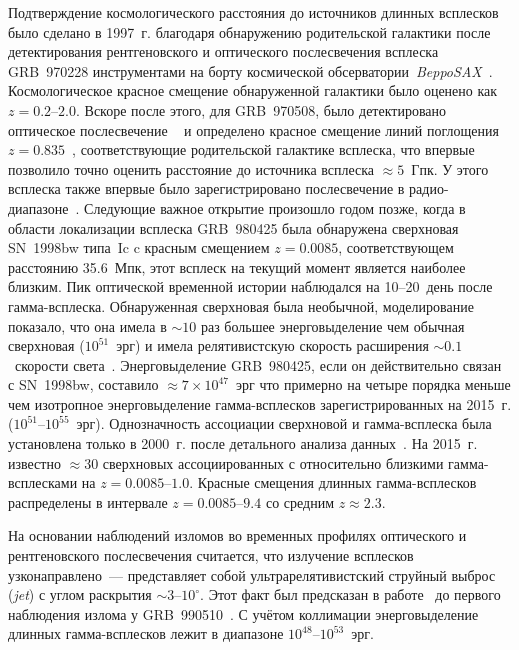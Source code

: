 Подтверждение космологического расстояния до источников длинных всплесков 
было сделано в 1997~г. благодаря обнаружению родительской галактики после детектирования 
рентгеновского и оптического послесвечения всплеска GRB~970228 инструментами на 
борту космической обсерватории~\textit{BeppoSAX}~\citep{Costa1997Natur, van_Paradijs_1997Natur}.
Космологическое красное смещение обнаруженной галактики было оценено как $z=0.2\mbox{--}2.0$.
Вскоре после этого, для GRB~970508, было детектировано оптическое послесвечение 
~\citep{Djorgovski_1997Natur} и определено красное смещение линий 
поглощения $z=0.835$~\citep{Metzger_1997Natur, Reichart_1998ApJ}, соответствующие родительской галактике 
всплеска, что впервые позволило точно оценить расстояние до источника всплеска $\approx 5$~Гпк. 
У этого всплеска также впервые было зарегистрировано послесвечение в радио-диапазоне~\citep{Frail_1997Natur}.
Следующие важное открытие произошло годом позже, когда в области локализации 
всплеска GRB~980425 была обнаружена сверхновая SN~1998bw типа~Ic c красным смещением $z=0.0085$,
соответствующем расстоянию 35.6~Мпк, этот всплеск на текущий момент является наиболее близким.
Пик оптической временной истории наблюдался на 10--20~день после гамма-всплеска.
Обнаруженная сверхновая была необычной, моделирование показало, что она 
имела в $\sim 10$ раз большее энерговыделение чем обычная 
сверхновая ($10^{51}$~эрг) и имела релятивистскую скорость расширения 
$\sim 0.1$~скорости света~\citep{Hjorth_and_Bloom_2012in_book}. 
Энерговыделение GRB~980425, если он действительно связан с SN~1998bw, составило 
$\approx 7\times 10^{47}$~эрг что примерно на четыре порядка меньше чем изотропное энерговыделение 
гамма-всплесков зарегистрированных на 2015~г. ($10^{51}$--$10^{55}$~эрг).
Однозначность ассоциации сверхновой и гамма-всплеска была установлена только в 2000~г.
после детального анализа данных~\citep{Pian_2000ApJ}. На 2015~г. известно $\approx 30$
сверхновых ассоциированных с относительно близкими гамма-всплесками на $z=0.0085\mbox{--}1.0$.
Красные смещения длинных гамма-всплесков распределены в интервале $z=0.0085\mbox{--}9.4$ 
со средним $z\approx 2.3$.

На основании наблюдений изломов во временных профилях оптического и рентгеновского послесвечения 
считается, что излучение всплесков узконаправлено~--- представляет собой  ультрарелятивистский 
струйный выброс (\textit{jet}) с углом раскрытия $\sim 3\mbox{--}10^{\circ}$. 
Этот факт был предсказан в работе~\citep{Rhoads_1999ApJ} до первого наблюдения излома у GRB~990510~\citep{Stanek_1999ApJ}. 
С учётом коллимации энерговыделение длинных гамма-всплесков лежит в диапазоне $10^{48}$--$10^{53}$~эрг.

